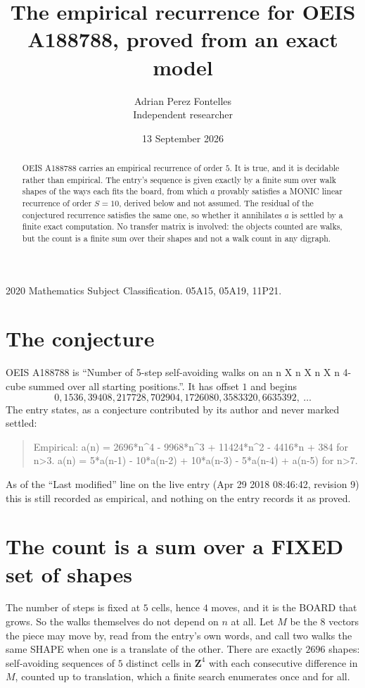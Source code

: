 \documentclass[11pt,a4paper]{article}
\title{The empirical recurrence for OEIS A188788, proved from an exact model}
\author{Adrian Perez Fontelles\\ \small Independent researcher}
\date{13 September 2026}
\theoremstyle{plain}
\theoremstyle{definition}
\begin{document}
\maketitle

\begin{abstract}
OEIS A188788 carries an empirical recurrence of order $5$. It is true, and it is
decidable rather than empirical. The entry's sequence is given exactly by a finite sum over walk shapes of the ways each fits the board, from
which $a$ provably satisfies a MONIC linear recurrence of order $S=10$, derived below and not
assumed. The residual of the conjectured recurrence satisfies the same one, so whether it
annihilates $a$ is settled by a finite exact computation. No transfer matrix is involved: the objects counted are walks, but the count is a finite sum over their shapes and not a walk count in any digraph.
\end{abstract}

\noindent\small 2020 Mathematics Subject Classification. 05A15, 05A19, 11P21.\normalsize

\section{The conjecture}

OEIS A188788 is ``Number of 5-step self-avoiding walks on an n X n X n X n 4-cube summed over all starting positions.''. It has offset $1$ and begins
\[
0, 1536, 39408, 217728, 702904, 1726080, 3583320, 6635392,\ \dots
\]
The entry states, as a conjecture contributed by its author and never marked settled:
\begin{quote}
Empirical: a(n) = 2696*n\^{}4 - 9968*n\^{}3 + 11424*n\^{}2 - 4416*n + 384 for n>3. a(n) = 5*a(n-1) - 10*a(n-2) + 10*a(n-3) - 5*a(n-4) + a(n-5) for n>7.
\end{quote}
As of the ``Last modified'' line on the live entry (Apr 29 2018 08:46:42, revision 9)
this is still recorded as empirical, and nothing on the entry records it as proved.

\section{The count is a sum over a FIXED set of shapes}

The number of steps is fixed at $5$ cells, hence $4$ moves, and it is the BOARD
that grows. So the walks themselves do not depend on $n$ at all. Let $M$ be the $8$
vectors the piece may move by, read from the entry's own words, and call two walks the same
SHAPE when one is a translate of the other. There are exactly $2696$ shapes: self-avoiding
sequences of $5$ distinct cells in $\mathbf{Z}^{4}$ with each consecutive difference in
$M$, counted up to translation, which a finite search enumerates once and for all.
\end{document}
